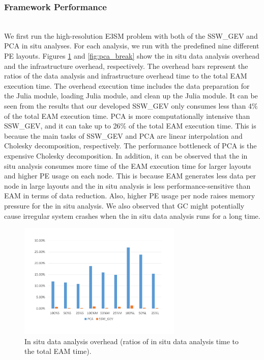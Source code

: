 \documentclass{juliacon}
\begin{document}
\subsubsection{Framework Performance}\hspace*{\fill} \\

We first run the high-resolution E3SM problem with both of the SSW\_GEV and PCA in situ analyses. For each analysis, we run with the predefined nine different PE layouts. Figures \ref{fig:ssw_break} and \ref{fig:pca_break} show the in situ data analysis overhead and the infrastructure overhead, respectively. The overhead bars represent the ratios of the data analysis and infrastructure overhead time to the total EAM execution time. The overhead execution time includes the data preparation for the Julia module, loading Julia module, and clean up the Julia module. It can be seen from the results that our developed SSW\_GEV only consumes less than 4\% of the total EAM execution time. PCA is more computationally intensive than SSW\_GEV, and it can take up to 26\% of the total EAM execution time. This is because the main tasks of SSW\_GEV and PCA are linear interpolation and Cholesky decomposition, respectively. The performance bottleneck of PCA is the expensive Cholesky decomposition. In addition, it can be observed that the in situ analysis consumes more time of the EAM execution time for larger layouts and higher PE usage on each node. This is because EAM generates less data per node in large layouts and the in situ analysis is less performance-sensitive than EAM in terms of data reduction. Also, higher PE usage per node raises memory pressure for the in situ analysis. We also observed that GC might potentially cause irregular system crashes when the in situ data analysis runs for a long time.

\begin{figure}
    \centering
    \includegraphics[width=\linewidth, height=5.5cm]{paper/figures/analysisoverhead.pdf}
    \caption{In situ data analysis overhead (ratios of in situ data analysis time to the total EAM time).}
    \label{fig:ssw_break}
\end{figure}
\end{document}
